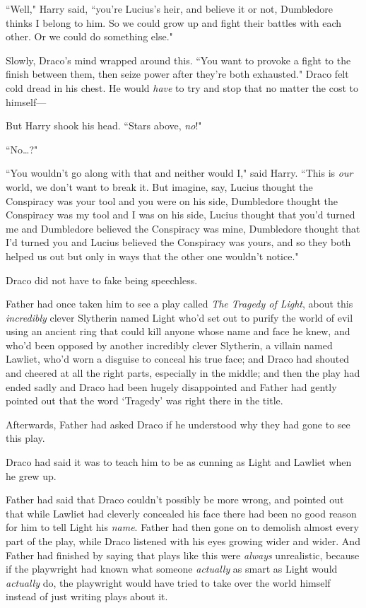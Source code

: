 ``Well," Harry said, ``you're Lucius's heir, and believe it or not, Dumbledore thinks I belong to him. So we could grow up and fight their battles with each other. Or we could do something else."

Slowly, Draco's mind wrapped around this. ``You want to provoke a fight to the finish between them, then seize power after they're both exhausted." Draco felt cold dread in his chest. He would \emph{have} to try and stop that no matter the cost to himself—

But Harry shook his head. ``Stars above, \emph{no}!"

``No{\ldots}?"

``You wouldn't go along with that and neither would I," said Harry. ``This is \emph{our} world, we don't want to break it. But imagine, say, Lucius thought the Conspiracy was your tool and you were on his side, Dumbledore thought the Conspiracy was my tool and I was on his side, Lucius thought that you'd turned me and Dumbledore believed the Conspiracy was mine, Dumbledore thought that I'd turned you and Lucius believed the Conspiracy was yours, and so they both helped us out but only in ways that the other one wouldn't notice."

Draco did not have to fake being speechless.

Father had once taken him to see a play called \emph{The Tragedy of Light}, about this \emph{incredibly} clever Slytherin named Light who'd set out to purify the world of evil using an ancient ring that could kill anyone whose name and face he knew, and who'd been opposed by another incredibly clever Slytherin, a villain named Lawliet, who'd worn a disguise to conceal his true face; and Draco had shouted and cheered at all the right parts, especially in the middle; and then the play had ended sadly and Draco had been hugely disappointed and Father had gently pointed out that the word `Tragedy' was right there in the title.

Afterwards, Father had asked Draco if he understood why they had gone to see this play.

Draco had said it was to teach him to be as cunning as Light and Lawliet when he grew up.

Father had said that Draco couldn't possibly be more wrong, and pointed out that while Lawliet had cleverly concealed his face there had been no good reason for him to tell Light his \emph{name}. Father had then gone on to demolish almost every part of the play, while Draco listened with his eyes growing wider and wider. And Father had finished by saying that plays like this were \emph{always} unrealistic, because if the playwright had known what someone \emph{actually} as smart as Light would \emph{actually} do, the playwright would have tried to take over the world himself instead of just writing plays about it.

